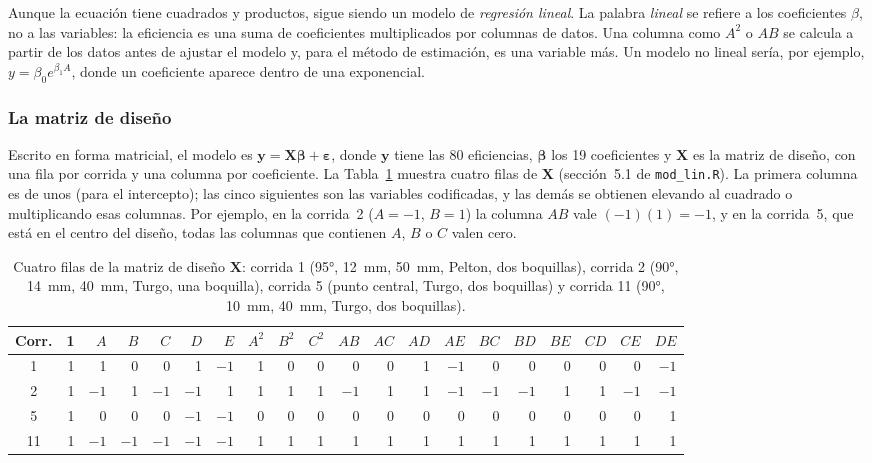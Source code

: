 Aunque la ecuación tiene cuadrados y productos, sigue siendo un modelo de \emph{regresión lineal}. La palabra \emph{lineal} se refiere a los coeficientes $\beta$, no a las variables: la eficiencia es una suma de coeficientes multiplicados por columnas de datos. Una columna como $A^2$ o $AB$ se calcula a partir de los datos antes de ajustar el modelo y, para el método de estimación, es una variable más. Un modelo no lineal sería, por ejemplo, $y = \beta_0 e^{\beta_1 A}$, donde un coeficiente aparece dentro de una exponencial.

\subsubsection{La matriz de diseño}

Escrito en forma matricial, el modelo es $\mathbf{y} = \mathbf{X}\bm{\beta} + \bm{\varepsilon}$, donde $\mathbf{y}$ tiene las 80 eficiencias, $\bm{\beta}$ los 19 coeficientes y $\mathbf{X}$ es la matriz de diseño, con una fila por corrida y una columna por coeficiente. La Tabla~\ref{tab:matrizX} muestra cuatro filas de $\mathbf{X}$ (sección~5.1 de \texttt{mod\_lin.R}). La primera columna es de unos (para el intercepto); las cinco siguientes son las variables codificadas, y las demás se obtienen elevando al cuadrado o multiplicando esas columnas. Por ejemplo, en la corrida~2 ($A = -1$, $B = 1$) la columna $AB$ vale $(-1)(1) = -1$, y en la corrida~5, que está en el centro del diseño, todas las columnas que contienen $A$, $B$ o $C$ valen cero.

\begin{table}[ht]
\centering
\caption{Cuatro filas de la matriz de diseño $\mathbf{X}$: corrida 1 (95°, 12~mm, 50~mm, Pelton, dos boquillas), corrida 2 (90°, 14~mm, 40~mm, Turgo, una boquilla), corrida 5 (punto central, Turgo, dos boquillas) y corrida 11 (90°, 10~mm, 40~mm, Turgo, dos boquillas).}
\label{tab:matrizX}
\setlength{\tabcolsep}{2.6pt}
\footnotesize
\begin{tabular}{c|r|rrrrr|rrr|rrrrrrrrrr}
\toprule
Corr. & 1 & $A$ & $B$ & $C$ & $D$ & $E$ & $A^2$ & $B^2$ & $C^2$ & $AB$ & $AC$ & $AD$ & $AE$ & $BC$ & $BD$ & $BE$ & $CD$ & $CE$ & $DE$ \\
\midrule
1  & 1 &  1 &  0 &  0 &  1 & $-1$ & 1 & 0 & 0 &  0 & 0 & 1 & $-1$ &  0 &  0 & 0 & 0 &  0 & $-1$ \\
2  & 1 & $-1$ &  1 & $-1$ & $-1$ &  1 & 1 & 1 & 1 & $-1$ & 1 & 1 & $-1$ & $-1$ & $-1$ & 1 & 1 & $-1$ & $-1$ \\
5  & 1 &  0 &  0 &  0 & $-1$ & $-1$ & 0 & 0 & 0 &  0 & 0 & 0 &  0 &  0 &  0 & 0 & 0 &  0 &  1 \\
11 & 1 & $-1$ & $-1$ & $-1$ & $-1$ & $-1$ & 1 & 1 & 1 &  1 & 1 & 1 &  1 &  1 &  1 & 1 & 1 &  1 &  1 \\
\bottomrule
\end{tabular}
\end{table}

